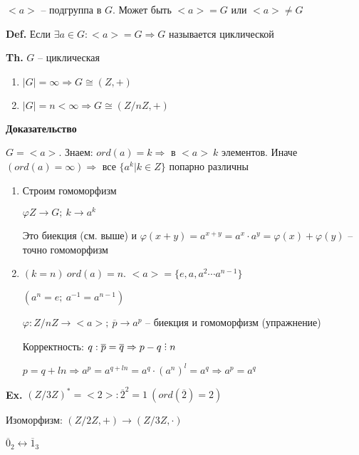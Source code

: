 \documentclass[14pt, letter paper]{article}
\def\divby{%
  \mathrel{\text{\vbox{\baselineskip.65ex\lineskiplimit0pt\hbox{.}\hbox{.}\hbox{.}}}}%
}
\begin{document}
\vspace{5mm}

$<a>$ -- подгруппа в $G$. Может быть $<a> = G$ или $<a> \neq G$

\textbf{Def.} Если $\exists a \in G : <a> = G \Rightarrow G$ называется циклической

\textbf{Th.} $G$ -- циклическая

\begin{enumerate}
    \item $|G| = \infty \Rightarrow G \cong (Z, +)$

    \item $|G| = n < \infty \Rightarrow G \cong (Z/nZ, +)$
\end{enumerate}

\begin{center}
    \textbf{Доказательство}
\end{center}

$G = <a>$. Знаем: $ord(a) = k \Rightarrow$ в $<a>\ k$ элементов. Иначе $(ord(a) = \infty) \Rightarrow$ все $\{a^k| k \in Z\}$ попарно различны

\begin{enumerate}
    \item Строим гомоморфизм

    $\varphi Z \rightarrow G;\ k \rightarrow a^k$

    Это биекция (см. выше) и $\varphi(x + y) = a^{x + y} = a^x \cdot a^y = \varphi(x) + \varphi(y)$ -- точно гомоморфизм

    \item $(k = n)\ ord(a) = n$. $<a> = \{ e, a, a^2 \cdots a^{n-1}\}$

    $(a^n = e;\ a^{-1} = a^{n-1})$

    $\varphi : Z/nZ \rightarrow <a>;\ \overline{p} \rightarrow a^p$ -- биекция и гомоморфизм (упражнение)

    Корректность: $q : \overline{p} = \overline{q} \Rightarrow p - q \divby n$

    $p = q + ln \Rightarrow a^p = a^{q + ln} = a^q \cdot (a^n)^l = a^q \Rightarrow a^p = a^q$
\end{enumerate}

\vspace{5mm}

\textbf{Ex.} $(Z/3Z)^* = <2> : \overline{2}^2 = 1\ (ord(\overline{2}) = 2)$

Изоморфизм: $(Z/2Z, +) \rightarrow (Z/3Z, \cdot)$

$\overline{0}_2 \leftrightarrow \overline{1}_3$
\end{document}
